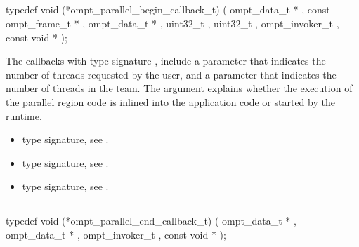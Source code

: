 \subsection{}
\label{subsec:ompt_parallel_begin_callback_t}
\format
\begin{boxedcode}
typedef void (*ompt_parallel_begin_callback_t) (
               ompt_data_t * ,
               const ompt_frame_t * ,  
               ompt_data_t * ,
               uint32_t , 
               uint32_t , 
               ompt_invoker_t , 
               const void *  
);
\end{boxedcode}

\descr
The callbacks with type signature , 
include a parameter  
that indicates the number of threads requested by the user, and a parameter
 that indicates the number of threads in the team.
The  argument explains whether the execution of the parallel
region code is inlined into the application code or started by the runtime.

\crossreferences
\begin{itemize}
\item {} type signature, see 
.
\item {} type signature, see 
.
\item {} type signature, see 
.
\end{itemize}



\subsection{}
\label{subsec:ompt_parallel_end_callback_t}
\format
\begin{boxedcode}
typedef void (*ompt_parallel_end_callback_t) (
               ompt_data_t * ,
               ompt_data_t * ,
               ompt_invoker_t ,
               const void * 
);
\end{boxedcode}

